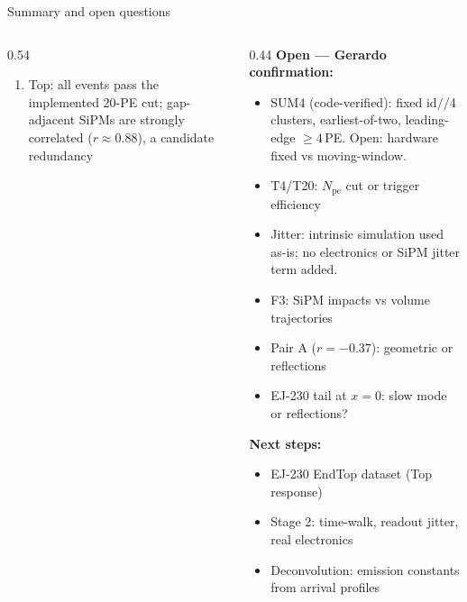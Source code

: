 \documentclass[aspectratio=169,9pt]{beamer}
\begin{document}
\begin{frame}{Summary and open questions}
\begin{columns}[T]
\begin{column}{0.54\textwidth}
\begin{enumerate}
        \item Top: all events pass the implemented 20-PE cut; gap-adjacent SiPMs
              are strongly correlated ($r\approx0.88$), a candidate redundancy
      \end{enumerate}
    \end{column}
    \begin{column}{0.44\textwidth}
      \textbf{\color{pendgold} Open — Gerardo confirmation:}
      \begin{itemize}
        \item[$\boxtimes$] SUM4 (code-verified): fixed id$/\!/$4 clusters,
              earliest-of-two, leading-edge $\geq4$\,PE.
              Open: hardware fixed vs moving-window.
        \item[$\square$] T4/T20: $N_\text{pe}$ cut or trigger efficiency
        \item[$\boxtimes$] Jitter: intrinsic simulation used as-is;
              no electronics or SiPM jitter term added.
        \item[$\square$] F3: SiPM impacts vs volume trajectories
        \item[$\square$] Pair A ($r=-0.37$):
              geometric or reflections
        \item[$\square$] EJ-230 tail at $x=0$:
              slow mode or reflections?
      \end{itemize}
      \vspace{0.05em}
      \textbf{Next steps:}
      \begin{itemize}
        \item EJ-230 EndTop dataset (Top response)
        \item Stage 2: time-walk, readout jitter, real electronics
        \item Deconvolution: emission constants from arrival profiles
      \end{itemize}
    \end{column}
  \end{columns}
\end{frame}
\end{document}
